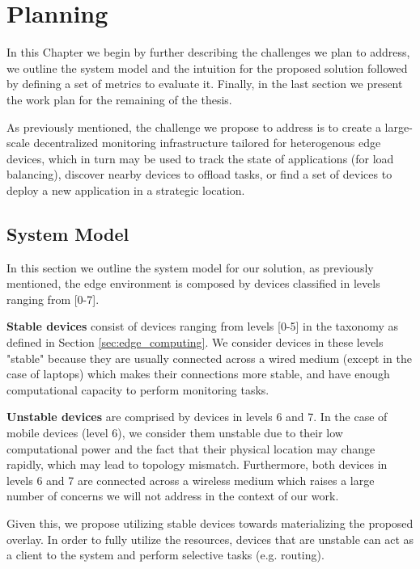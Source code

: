 \chapter{Planning} \label{cha:planning}

In this Chapter we begin by further describing the challenges we plan to address, we outline the system model and the intuition for the proposed solution followed by defining a set of metrics to evaluate it. Finally, in the last section we present the work plan for the remaining of the thesis. 

As previously mentioned, the challenge we propose to address is to create a large-scale decentralized monitoring infrastructure tailored for heterogenous edge devices, which in turn may be used to track the state of applications (for load balancing), discover nearby devices to offload tasks, or find a set of devices to deploy a new application in a strategic location. 

\section{System Model}

In this section we outline the system model for our solution, as previously mentioned, the edge environment is composed by devices classified in levels ranging from [0-7].  

\textbf{Stable devices} consist of devices ranging from levels [0-5] in the taxonomy as defined in Section \ref{sec:edge_computing}. We consider devices in these levels "stable" because they are usually connected across a wired medium (except in the case of laptops) which makes their connections more stable, and have enough computational capacity to perform monitoring tasks.

\textbf{Unstable devices} are comprised by devices in levels 6 and 7. In the case of mobile devices (level 6), we consider them unstable due to their low computational power and the fact that their physical location may change rapidly, which may lead to topology mismatch. Furthermore, both devices in levels 6 and 7 are connected across a wireless medium which raises a large number of concerns we will not address in the context of our work.

Given this, we propose utilizing stable devices towards materializing the proposed overlay. In order to fully utilize the resources, devices that are unstable can act as a client to the system and perform selective tasks (e.g. routing). 

